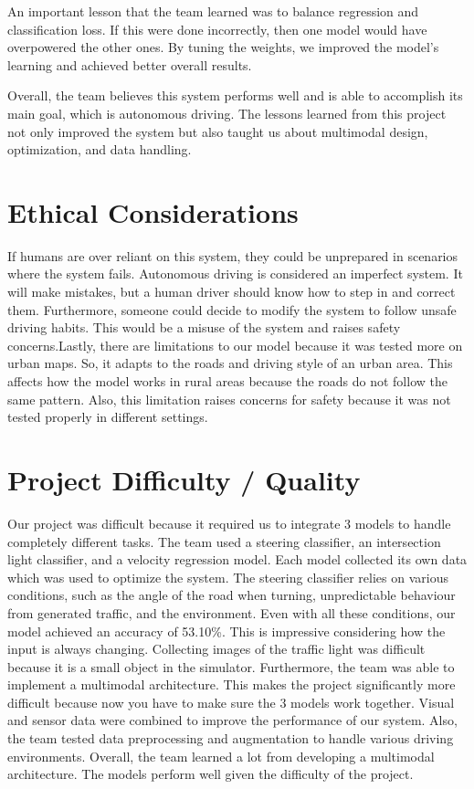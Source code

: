 \documentclass{article} %
\begin{document}
An important lesson that the team learned was to balance regression and classification loss. If this
were done incorrectly, then one model would have overpowered the other ones. By tuning the weights,
we improved the model's learning and achieved better overall results.

Overall, the team believes this system performs well and is able to accomplish its main goal, which is
autonomous driving. The lessons learned from this project not only improved the system but also taught
us about multimodal design, optimization, and data handling.


\section{Ethical Considerations}

If humans are over reliant on this system, they could be unprepared in scenarios where the system fails.
Autonomous driving is considered an imperfect system. It will make mistakes, but a human driver should
know how to step in and correct them. Furthermore, someone could decide to modify the system to follow
unsafe driving habits. This would be a misuse of the system and raises safety concerns.Lastly, there are limitations to our model because it was tested more on urban maps. So, it adapts to the
roads and driving style of an urban area. This affects how the model works in rural areas because the roads
do not follow the same pattern. Also, this limitation raises concerns for safety because it was not tested
properly in different settings.


\section{Project Difficulty / Quality}

Our project was difficult because it required us to integrate 3 models to handle completely different
tasks. The team used a steering classifier, an intersection light classifier, and a velocity regression
model. Each model collected its own data which was used to optimize the system. The steering classifier
relies on various conditions, such as the angle of the road when turning, unpredictable behaviour from
generated traffic, and the environment. Even with all these conditions, our model achieved an accuracy
of 53.10\%. This is impressive considering how the input is always changing. Collecting images of the traffic light was difficult because it is a small object in the simulator.
Furthermore, the team was able to implement a multimodal architecture. This makes the project
significantly more difficult because now you have to make sure the 3 models work together. Visual and
sensor data were combined to improve the performance of our system. Also, the team tested data
preprocessing and augmentation to handle various driving environments. Overall, the team learned a lot from developing a multimodal architecture. The models perform well given
the difficulty of the project.



\label{last_page}



\end{document}

